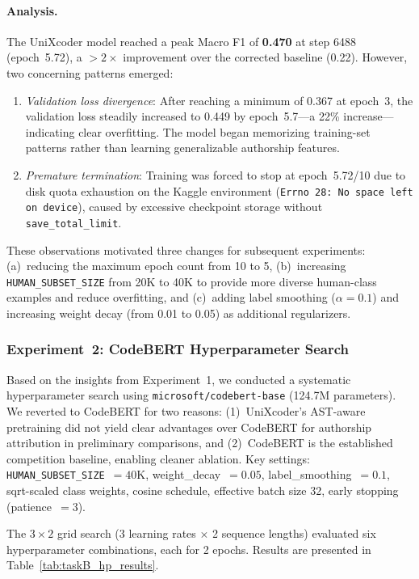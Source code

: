 \documentclass[11pt]{article}
\begin{document}
\paragraph{Analysis.} The UniXcoder model reached a peak Macro F1 of \textbf{0.470} at step 6488 (epoch~5.72), a ${>}2\times$ improvement over the corrected baseline (0.22). However, two concerning patterns emerged:

\begin{enumerate}
    \item \textit{Validation loss divergence}: After reaching a minimum of 0.367 at epoch~3, the validation loss steadily increased to 0.449 by epoch~5.7---a 22\% increase---indicating clear overfitting. The model began memorizing training-set patterns rather than learning generalizable authorship features.
    \item \textit{Premature termination}: Training was forced to stop at epoch~5.72/10 due to disk quota exhaustion on the Kaggle environment (\texttt{Errno~28: No space left on device}), caused by excessive checkpoint storage without \texttt{save\_total\_limit}.
\end{enumerate}

These observations motivated three changes for subsequent experiments: (a)~reducing the maximum epoch count from 10 to 5, (b)~increasing \texttt{HUMAN\_SUBSET\_SIZE} from 20K to 40K to provide more diverse human-class examples and reduce overfitting, and (c)~adding label smoothing ($\alpha = 0.1$) and increasing weight decay (from 0.01 to 0.05) as additional regularizers.

\subsubsection{Experiment~2: CodeBERT Hyperparameter Search}

Based on the insights from Experiment~1, we conducted a systematic hyperparameter search using \texttt{microsoft/codebert-base} (124.7M parameters). We reverted to CodeBERT for two reasons: (1)~UniXcoder's AST-aware pretraining did not yield clear advantages over CodeBERT for authorship attribution in preliminary comparisons, and (2)~CodeBERT is the established competition baseline, enabling cleaner ablation.
Key settings: \texttt{HUMAN\_SUBSET\_SIZE}~$= 40\text{K}$, weight\_decay~$= 0.05$, label\_smoothing~$= 0.1$, sqrt-scaled class weights, cosine schedule, effective batch size 32, early stopping (patience~$= 3$).

The $3 \times 2$ grid search (3 learning rates $\times$ 2 sequence lengths) evaluated six hyperparameter combinations, each for 2 epochs. Results are presented in Table~\ref{tab:taskB_hp_results}.
\end{document}
